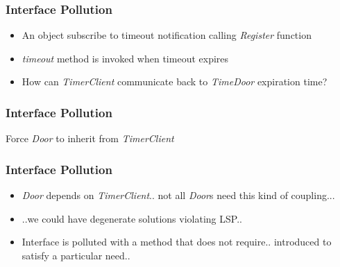 \documentclass{beamer}
\begin{document}
\begin{frame}
  \frametitle{Interface Pollution}
  \begin{itemize}
	\item<+-> An object subscribe to timeout notification calling \textit{Register} function 
	\item<+-> \textit{timeout} method is invoked when timeout expires 
	\item<+-> How can \textit{TimerClient} communicate back to \textit{TimeDoor} expiration time?
   \end{itemize}
\end{frame}

\begin{frame}
	\frametitle{Interface Pollution}
	Force \textit{Door} to inherit from \textit{TimerClient}
	\begin{center}
	\end{center}
\end{frame}

\begin{frame}
  \frametitle{Interface Pollution}
  \begin{itemize}
	\item<+-> \textit{Door} depends on \textit{TimerClient}.. not all \textit{Door}s need this kind of coupling... 
	\item<+-> ..we could have degenerate solutions violating LSP..\\
	\item<+-> Interface is polluted with a method that does not require.. introduced to satisfy a particular need..
   \end{itemize}
\end{frame}
\end{document}

